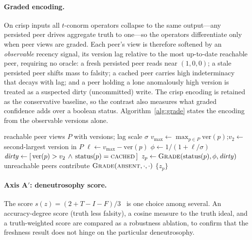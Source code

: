 \documentclass[fleqn,10pt]{wlscirep}
\begin{document}
\paragraph{Graded encoding.} On crisp inputs all $t$-conorm operators collapse to the same output---any
persisted peer drives aggregate truth to one---so the operators differentiate only when peer views are
graded. Each peer's
view is therefore softened by an \emph{observable} recency signal, its version lag relative to the
most up-to-date reachable peer, requiring no oracle: a fresh persisted peer reads near $(1,0,0)$; a
stale persisted peer shifts mass to falsity; a cached peer carries high indeterminacy that decays with
lag; and a peer holding a lone anomalously high version is treated as a suspected dirty (uncommitted)
write. The crisp encoding is retained as the conservative baseline, so the contrast also measures what
graded confidence adds over a boolean status. Algorithm~\ref{alg:grade} states the encoding from the
observable versions alone.

\begin{algorithm}[t]
\caption{Graded confidence encoding from observable version lag}
\label{alg:grade}
\begin{algorithmic}[1]
\Require reachable peer views $P$ with versions; lag scale $\sigma$
\State $v_{\max}\gets \max_{p\in P}\mathrm{ver}(p)$;\quad $v_{2}\gets$ second-largest version in $P$
  \State $\ell \gets v_{\max}-\mathrm{ver}(p)$ 
  \State $\phi \gets 1/(1+\ell/\sigma)$ 
  \State $\mathit{dirty}\gets [\,\mathrm{ver}(p)>v_{2}\,\wedge\,\mathrm{status}(p)=\textsc{cached}\,]$ 
  \State $z_p\gets \textsc{Grade}(\mathrm{status}(p),\phi,\mathit{dirty})$ 
\EndFor
\State unreachable peers contribute $\textsc{Grade}(\textsc{absent},\cdot,\cdot)$
\State \Return $\{z_p\}$
\end{algorithmic}
\end{algorithm}

\paragraph{Axis A$'$: deneutrosophy score.} The score $s(z)=(2+T-I-F)/3$~\cite{ye2014score} is one
choice among several. An accuracy-degree score (truth less falsity), a cosine measure to the truth
ideal, and a truth-weighted score are compared as a robustness ablation, to confirm that the freshness
result does not hinge on the particular deneutrosophy.
\end{document}
